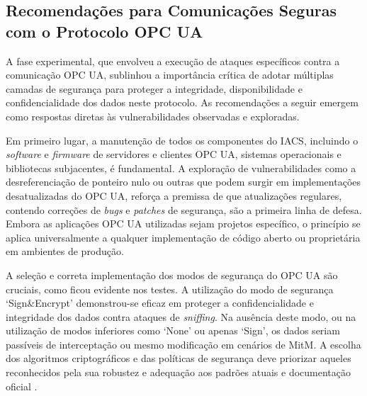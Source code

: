     \subsection{Recomendações para Comunicações Seguras com o Protocolo OPC UA}

        A fase experimental, que envolveu a execução de ataques específicos contra a comunicação OPC UA, sublinhou a importância crítica de adotar múltiplas camadas de segurança para proteger a integridade, disponibilidade e confidencialidade dos dados neste protocolo. As recomendações a seguir emergem como respostas diretas às vulnerabilidades observadas e exploradas.

        Em primeiro lugar, a manutenção de todos os componentes do IACS, incluindo o \textit{software} e \textit{firmware} de servidores e clientes OPC UA, sistemas operacionais e bibliotecas subjacentes, é fundamental. A exploração de vulnerabilidades como a desreferenciação de ponteiro nulo ou outras que podem surgir em implementações desatualizadas do OPC UA, reforça a premissa de que atualizações regulares, contendo correções de \textit{bugs} e \textit{patches} de segurança, são a primeira linha de defesa. Embora as aplicações OPC UA utilizadas sejam projetos específico, o princípio se aplica universalmente a qualquer implementação de código aberto ou proprietária em ambientes de produção.

        A seleção e correta implementação dos modos de segurança do OPC UA são cruciais, como ficou evidente nos testes. A utilização do modo de segurança `Sign\&Encrypt' demonstrou-se eficaz em proteger a confidencialidade e integridade dos dados contra ataques de \textit{sniffing}. Na ausência deste modo, ou na utilização de modos inferiores como `None' ou apenas `Sign', os dados seriam passíveis de interceptação ou mesmo modificação em cenários de MitM. A escolha dos algoritmos criptográficos e das políticas de segurança deve priorizar aqueles reconhecidos pela sua robustez e adequação aos padrões atuais e documentação oficial \cite{opc2024}. %


